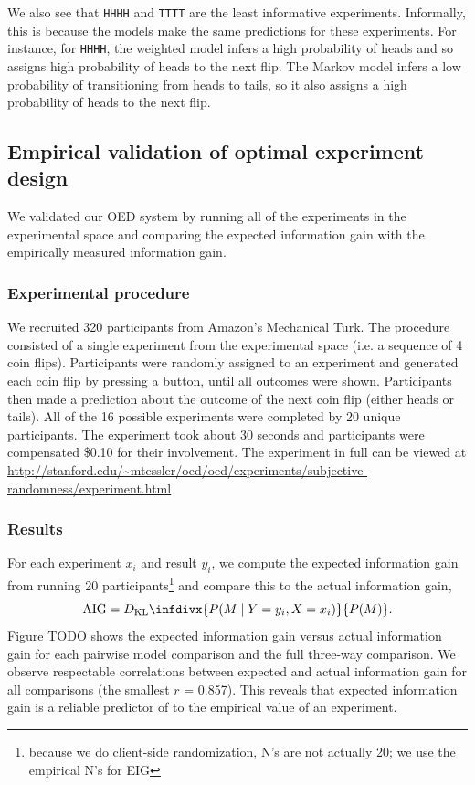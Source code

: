 \documentclass{article}
\newcommand{\dkl}{D_\mathrm{KL}\infdivx}
\begin{document}
We also see that \lstinline{HHHH} and \lstinline{TTTT} are the least informative experiments.
Informally, this is because the models make the same predictions for these experiments.
For instance, for \lstinline{HHHH}, the weighted model infers a high probability of heads and so assigns high probability of heads to the next flip.
The Markov model infers a low probability of transitioning from heads to tails, so it also assigns a high probability of heads to the next flip.

\subsection{Empirical validation of optimal experiment design}
We validated our OED system by running all of the experiments in the experimental space and comparing the expected information gain with the empirically measured information gain.

\subsubsection{Experimental procedure}

We recruited 320 participants from Amazon's Mechanical Turk. The procedure consisted of a single experiment from the experimental space (i.e. a sequence of 4 coin flips). Participants were randomly assigned to an experiment and generated each coin flip by pressing a button, until all outcomes were shown. Participants then made a prediction about the outcome of the next coin flip (either heads or tails). All of the 16 possible experiments were completed by 20 unique participants. The experiment took about 30 seconds and participants were compensated \$0.10 for their involvement. The experiment in full can be viewed at \url{http://stanford.edu/~mtessler/oed/oed/experiments/subjective-randomness/experiment.html}

\subsubsection{Results}

For each experiment $x_i$ and result $y_i$, we compute the expected information gain from running 20 participants\footnote{because we do client-side randomization, N's are not actually 20; we use the empirical N's for EIG} and compare this to the actual information gain,
$$\mathrm{AIG} = \dkl{P(M \mid Y = y_i, X = x_i)}{P(M)}.$$
Figure TODO shows the expected information gain versus actual information gain for each pairwise model comparison and the full three-way comparison.
We observe respectable correlations between expected and actual information gain for all comparisons (the smallest $r$ = 0.857).
This reveals that expected information gain is a reliable predictor of to the empirical value of an experiment.
\end{document}
